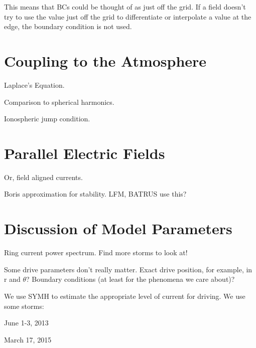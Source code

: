 This means that BCs could be thought of as just off the grid. If a field doesn't
try to use the value just off the grid to differentiate or interpolate a value
at the edge, the boundary condition is not used. 

\section{Coupling to the Atmosphere}

Laplace's Equation. 

Comparison to spherical harmonics. 

Ionospheric jump condition. 

\section{Parallel Electric Fields}

Or, field aligned currents. 

Boris approximation for stability. LFM, BATRUS use this? 


\section{Discussion of Model Parameters}

Ring current power spectrum. Find more storms to look at! 

Some drive parameters don't really matter. Exact drive position, for example, in r and $\theta$? Boundary conditions (at least for the phenomena we care about)?

We use SYMH to estimate the appropriate level of current for driving. We use some storms:

June 1-3, 2013

March 17, 2015

